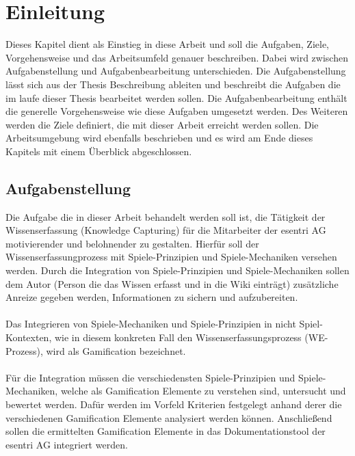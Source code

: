 \documentclass[a4paper,12pt]{scrartcl}
\begin{document}
\section{Einleitung}
Dieses Kapitel dient als Einstieg in diese Arbeit und soll die Aufgaben, Ziele, Vorgehensweise und das Arbeitsumfeld genauer beschreiben. Dabei wird zwischen Aufgabenstellung und Aufgabenbearbeitung unterschieden. Die Aufgabenstellung lässt sich aus der Thesis Beschreibung ableiten und beschreibt die Aufgaben die im laufe dieser Thesis bearbeitet werden sollen. Die Aufgabenbearbeitung enthält die generelle Vorgehensweise wie diese Aufgaben umgesetzt werden. Des Weiteren werden die Ziele definiert, die mit dieser Arbeit erreicht werden sollen. Die Arbeitsumgebung wird ebenfalls beschrieben und es wird am Ende dieses Kapitels mit einem Überblick abgeschlossen. 
\subsection{Aufgabenstellung}
Die Aufgabe die in dieser Arbeit behandelt werden soll ist, die Tätigkeit der Wissenserfassung (Knowledge Capturing) für die Mitarbeiter der esentri AG motivierender und belohnender zu gestalten. Hierfür soll der Wissenserfassungprozess mit Spiele-Prinzipien und Spiele-Mechaniken versehen werden. Durch die Integration von Spiele-Prinzipien und Spiele-Mechaniken sollen dem Autor (Person die das Wissen erfasst und in die Wiki einträgt) zusätzliche Anreize gegeben werden, Informationen zu sichern und aufzubereiten. 
\\\\
Das Integrieren von Spiele-Mechaniken und Spiele-Prinzipien in nicht Spiel-Kontexten, wie in diesem konkreten Fall den Wissenserfassungsprozess (WE-Prozess), wird als Gamification bezeichnet.
\\\\
Für die Integration müssen die verschiedensten Spiele-Prinzipien und Spiele-Mechaniken, welche als Gamification Elemente zu verstehen sind, untersucht und bewertet werden. Dafür werden im Vorfeld Kriterien festgelegt anhand derer die verschiedenen Gamification Elemente analysiert werden können. Anschließend sollen die ermittelten Gamification Elemente in das Dokumentationstool der esentri AG integriert werden. 
\end{document}
